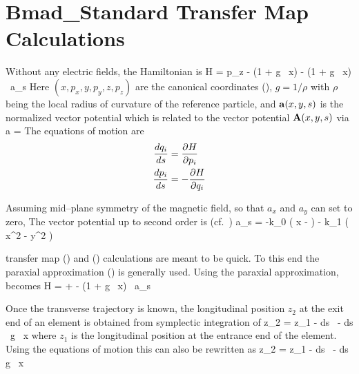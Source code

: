 \documentclass{book}
\begin{document}
\setlength{\parskip}{\dPar}
\setlength{\parindent}{0ex}

\newcommand{\bfM}{{\bf M}}
\newcommand{\bfK}{{\bf K}}

\section{Bmad\_Standard Transfer Map Calculations}
\label{s:bmad.standard}

Without any electric fields, the Hamiltonian is
\Begineq
  H = p_z - (1 + g \, x)  - 
  (1 + g \, x) \, a_s
  \label{h1gx1}
\Endeq
Here $(x, p_x, y, p_y, z, p_z)$ are the canonical coordinates
(), $g = 1/\rho$ with $\rho$ being the
local radius of curvature of the reference particle, and
${\bf a}(x,y,s)$ is the normalized vector potential which is related to
the vector potential ${\bf A}(x,y,s)$ via
\Begineq
  \Bf a = 
\Endeq
The equations of motion are
\begin{align}
  \frac{dq_i}{ds} &= \frac{\partial H}{\partial p_i} \nonumber \\
  \frac{dp_i}{ds} &= -\frac{\partial H}{\partial q_i}
  \label{rshp}
\end{align}

Assuming mid--plane symmetry of the magnetic field, so
that $a_x$ and $a_y$ can set to zero\cite{b:madphysics}, The vector
potential up to second order is (cf.~)
\Begineq
  a_s = -k_0 \left( x -  \right) -
   k_1 \left( x^2 - y^2 \right)
\Endeq

 transfer map () and ()
calculations are meant to be quick. To this end the paraxial
approximation () is generally used.  Using the paraxial
approximation,  becomes
\Begineq
  H =  +  - 
  (1 + g \, x) \, a_s 
  \label{hpapa}
\Endeq

Once the transverse trajectory is
known, the longitudinal position $z_2$ at the exit end of an element
is obtained from symplectic integration of  
\Begineq
  z_2 = z_1 -  \int \! ds \, 
  \left[ (p_x - a_x)^2 + (p_y - a_y)^2 \right] - \int \! ds \, g \, x
  \label{zz121p}
\Endeq
where $z_1$ is the longitudinal position at the entrance end of the element.
Using the equations of motion  this can also be rewritten as
\Begineq
  z_2 = z_1 -  \int \! ds \, 
   - 
  \int \! ds \, g \, x
  \label{zz12sx}
\Endeq
\end{document}
